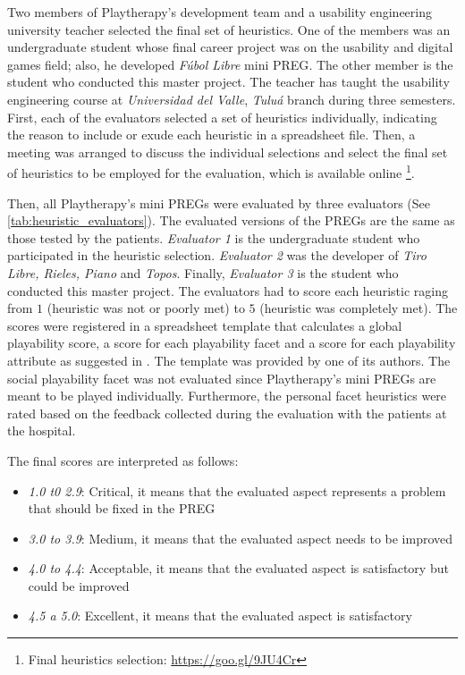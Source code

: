 Two members of Playtherapy's development team and a usability engineering university teacher selected the final set of heuristics. One of the members was an undergraduate student whose final career project was on the usability and digital games field; also, he developed \textit{F\'ubol Libre} mini \ac{PREG}. The other member is the student who conducted this master project. The teacher has taught the usability engineering course at \textit{Universidad del Valle}, \textit{Tulu\'a} branch during three semesters. First, each of the evaluators selected a set of heuristics individually, indicating the reason to include or exude each heuristic in a spreadsheet file. Then, a meeting was arranged to discuss the individual selections and select the final set of heuristics to be employed for the evaluation, which is available online \footnote{Final heuristics selection: \url{https://goo.gl/9JU4Cr}}.

Then, all Playtherapy's mini \acp{PREG} were evaluated by three evaluators (See \autoref{tab:heuristic_evaluators}). The evaluated versions of the \acp{PREG} are the same as those tested by the patients. \textit{Evaluator 1} is the undergraduate student who participated in the heuristic selection. \textit{Evaluator 2} was the developer of \textit{Tiro Libre, Rieles, Piano} and \textit{Topos}. Finally, \textit{Evaluator 3} is the student who conducted this master project. The evaluators had to score each heuristic raging from $1$ (heuristic was not or poorly met) to $5$ (heuristic was completely met). The scores were registered in a spreadsheet template that calculates a global playability score, a score for each playability facet and a score for each playability attribute as suggested in \autocite{sec:playability}. The template was provided by one of its authors. The social playability facet was not evaluated since Playtherapy's mini \acp{PREG} are meant to be played individually. Furthermore, the personal facet heuristics were rated based on the feedback collected during the evaluation with the patients at the hospital. 

The final scores are interpreted as follows:

\begin{itemize}
    \item \emph{1.0 t0 2.9}: Critical, it means that the evaluated aspect represents a problem that should be fixed in the \ac{PREG}
    \item \emph{3.0 to 3.9}: Medium, it means that the evaluated aspect needs to be improved 
    \item \emph{4.0 to 4.4}: Acceptable, it means that the evaluated aspect is satisfactory but could be improved
    \item \emph{4.5 a 5.0}: Excellent, it means that the evaluated aspect is satisfactory
\end{itemize}

